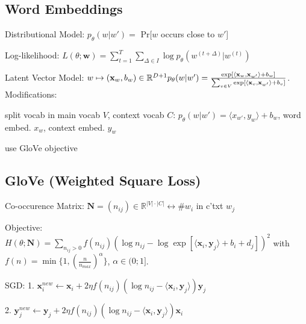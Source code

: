 \documentclass[a4paper, 11pt, landscape]{article}
\begin{document}
\begin{multicols*}{3}
\section{Word Embeddings}
\begin{compactdesc}
  \item[Distributional Model:] $p_\theta(w|w') = $ Pr[$w$ occurs close to $w'$]
  \item[Log-likelihood:] $L(\theta; \mathbf{w}) = \sum_{t=1}^T\sum_{\Delta \in I}{\log p_\theta(w^{(t+\Delta)}|w^{(t)})}$
  \item[Latent Vector Model:] $w \mapsto (\mathbf{x}_w, b_w) \in \mathbb{R}^{D+1} \\p_{\theta}(w|w') = \frac{\exp[\langle \mathbf{x}_w,\mathbf{x}_{w'}\rangle + b_w]}{\sum_{v\in V}{\exp[\langle \mathbf{x}_v,\mathbf{x}_{w'}\rangle + b_v ]}}$.
  Modifications:
  \begin{inparaitem}[\color{red}\textbullet]
  \item split vocab in main vocab $V$, context vocab $C$: $p_{\theta}(w|w') = \langle x_{w'}, y_{w} \rangle + b_w$, word embed. $x_w$, context embed. $y_w$
  \item use GloVe objective
  \end{inparaitem}
\end{compactdesc}

\subsection{GloVe (Weighted Square Loss)}
\begin{compactdesc}
  \item[Co-occurence Matrix:]$\mathbf{N} = (n_{ij}) \in \mathbb{R}^{|V|\cdot |C|} \leftrightarrow \# w_i$ in c'txt $w_j$
  \item[Objective:] $H(\theta;\mathbf{N}) = \sum_{n_{ij} > 0} f(n_{ij})(\log n_{ij} - \log \exp[\langle \mathbf{x}_i, \mathbf{y}_j \rangle + b_i + d_j])^2$ with $f(n) = \min\{1, (\frac{n}{n_{max}})^\alpha\}$, $\alpha \in (0;1]$.
\end{compactdesc}

\begin{compactdesc}
  \item[SGD:] 1. $\mathbf{x}_i^{new} \leftarrow \mathbf{x}_i + 2\eta f(n_{ij})(\log n_{ij} - \langle \mathbf{x}_i, \mathbf{y}_j \rangle)\mathbf{y}_j$
  \item \hspace{26pt}2. $\mathbf{y}_j^{new} \leftarrow \mathbf{y}_j + 2\eta f(n_{ij})(\log n_{ij} - \langle \mathbf{x}_i, \mathbf{y}_j \rangle)\mathbf{x}_i$
\end{compactdesc}


\end{multicols*}
\end{document}
